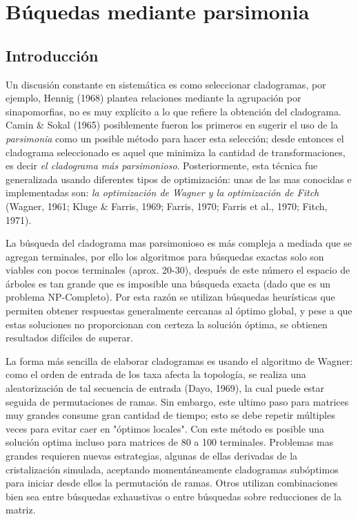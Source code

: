 
\chapter{B\'uquedas mediante parsimonia} %
\label{cha:parsimonia}

\section*{Introducci\'on} 

Un discusi\'on constante en sistem\'atica es como seleccionar cladogramas, por ejemplo, {\color{red}Hennig (1968)} plantea relaciones mediante la agrupaci\'on por sinapomorfias, no es muy expl\'icito a lo que refiere la obtenci\'on del cladograma. {\color{red}Camin \& Sokal (1965)} posiblemente fueron los primeros en sugerir el uso de la \textit{parsimonia} como un posible m\'etodo para hacer esta selecci\'on; desde entonces el cladograma seleccionado es aquel que minimiza la cantidad de transformaciones, es decir \textit{el cladograma m\'as parsimonioso}. Posteriormente, esta t\'ecnica fue generalizada usando diferentes tipos de optimizaci\'on: unas de las mas conocidas e implementadas son: \textit{la optimizaci\'on de Wagner y la optimizaci\'on de Fitch} {\color{red}(Wagner, 1961; Kluge \& Farris, 1969; Farris, 1970; Farris et al., 1970; Fitch, 1971)}.


La b\'usqueda del cladograma mas parsimonioso es m\'as compleja a mediada que se agregan terminales,  por ello los algoritmos para b\'usquedas exactas solo son viables con pocos terminales (aprox. 20-30),  despu\'es de este n\'umero el espacio de \'arboles es tan grande que es imposible una b\'usqueda exacta (dado que es un problema NP-Completo). Por esta raz\'on se utilizan b\'usquedas heur\'isticas que permiten obtener respuestas generalmente cercanas al \'optimo global,  y pese a que estas soluciones no proporcionan con certeza la soluci\'on \'optima, se obtienen resultados  dif\'iciles de superar.

La forma m\'as sencilla de elaborar cladogramas es usando el algoritmo de Wagner: como el orden de entrada de los taxa afecta la topolog\'ia,  se realiza una aleatorizaci\'on de tal secuencia de entrada {\color{red} (Dayo, 1969)},  la cual puede estar seguida de permutaciones de ramas. Sin embargo,  este ultimo paso para matrices muy grandes consume gran cantidad de tiempo; esto se debe repetir m\'ultiples veces para evitar caer en "\'optimos locales". Con este m\'etodo es posible una soluci\'on optima incluso para matrices de 80 a 100 terminales. Problemas mas grandes requieren nuevas estrategias,  algunas de ellas derivadas de la cristalizaci\'on simulada,  aceptando moment\'aneamente cladogramas sub\'optimos para iniciar desde ellos la permutaci\'on de ramas. Otros utilizan combinaciones bien sea entre b\'usquedas exhaustivas o entre b\'usquedas sobre reducciones de la matriz.

